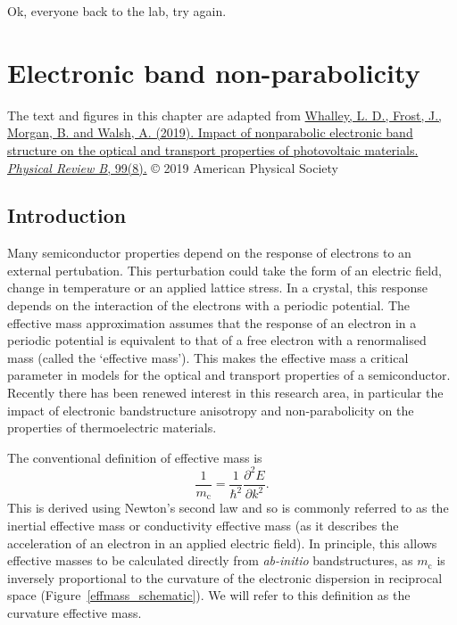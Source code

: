 \begin{savequote}[8cm]
Ok, everyone back to the lab, try again.
\end{savequote}

\chapter{\label{ch:4-effmass}Electronic band non-parabolicity}

The text and figures in this chapter are adapted from
\href{https://doi.org/10.1103/PhysRevB.99.085207}{Whalley, L. D., Frost, J., Morgan, B. and Walsh, A. (2019). Impact of nonparabolic electronic band structure on the optical and transport properties of photovoltaic materials. \textit{Physical Review B}, 99(8).} © 2019 American Physical Society

\section{Introduction}

Many semiconductor properties depend on the response of electrons to an external pertubation.
This perturbation could take the form of an electric field, change in temperature or an applied lattice stress.  %
In a crystal, this response depends on the interaction of the electrons with a periodic potential. 
The effective mass approximation assumes that the response of an electron in a periodic potential is equivalent to that of a free electron with a renormalised mass (called the `effective mass').
This makes the effective mass a critical parameter in models for the optical and transport properties of a semiconductor.
Recently there has been renewed interest in this research area, in particular the impact of electronic bandstructure anisotropy and non-parabolicity on the properties of thermoelectric materials.\autocite{Gibbs2017,Mecholsky2014}

The conventional definition of effective mass is
\begin{equation} \label{curvature}
\frac{1}{m_\text{c}}= \frac{1}{\hbar^2}\frac{\partial^2E}{\partial k^2}.
\end{equation}
This is derived using Newton's second law\autocite{Ashcroft1976,Ariel2012} and so is commonly referred to as the inertial effective mass or conductivity effective mass (as it describes the acceleration of an electron in an applied electric field).
In principle, this allows effective masses to be calculated directly from \textit{ab-initio} bandstructures,
as $m_\text{c}$ is inversely proportional to the curvature of the electronic dispersion in reciprocal space (Figure\ \ref{effmass_schematic}). 
We will refer to this definition as the curvature effective mass.

